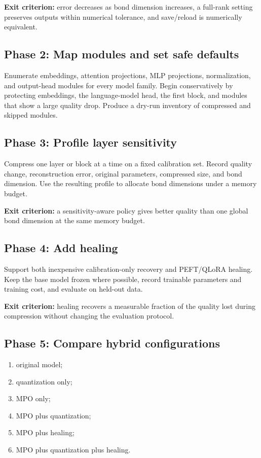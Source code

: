 \documentclass[11pt,a4paper]{article}
\begin{document}
\textbf{Exit criterion:} error decreases as bond dimension increases, a
full-rank setting preserves outputs within numerical tolerance, and
save/reload is numerically equivalent.

\subsection{Phase 2: Map modules and set safe defaults}

Enumerate embeddings, attention projections, MLP projections, normalization,
and output-head modules for every model family. Begin conservatively by
protecting embeddings, the language-model head, the first block, and modules
that show a large quality drop. Produce a dry-run inventory of compressed and
skipped modules.

\subsection{Phase 3: Profile layer sensitivity}

Compress one layer or block at a time on a fixed calibration set. Record
quality change, reconstruction error, original parameters, compressed size,
and bond dimension. Use the resulting profile to allocate bond dimensions
under a memory budget.

\textbf{Exit criterion:} a sensitivity-aware policy gives better quality than
one global bond dimension at the same memory budget.

\subsection{Phase 4: Add healing}

Support both inexpensive calibration-only recovery and PEFT/QLoRA healing.
Keep the base model frozen where possible, record trainable parameters and
training cost, and evaluate on held-out data.

\textbf{Exit criterion:} healing recovers a measurable fraction of the quality
lost during compression without changing the evaluation protocol.

\subsection{Phase 5: Compare hybrid configurations}

\begin{enumerate}[leftmargin=*]
  \item original model;
  \item quantization only;
  \item MPO only;
  \item MPO plus quantization;
  \item MPO plus healing;
  \item MPO plus quantization plus healing.
\end{enumerate}
\end{document}
